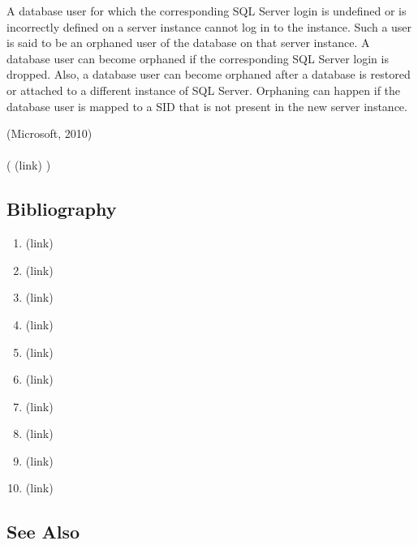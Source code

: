 \begin{DIC_BlockQuote} A database user for which the corresponding SQL Server login is undefined or is incorrectly defined on a server instance cannot log in to the instance. Such a user is said to be an orphaned user of the database on that server instance. A database user can become orphaned if the corresponding SQL Server login is dropped. Also, a database user can become orphaned after a database is restored or attached to a different instance of SQL Server. Orphaning can happen if the database user is mapped to a SID that is not present in the new server instance.  \end{DIC_BlockQuote} (Microsoft, 2010)  \paragraph{} (  (link) \href{Microsoft, 2010 }{ } )  \subsection*{Bibliography } \begin{enumerate} \item  (link) \href{Diodati and Ruddy, 2017 }{ } \item  (link) \href{Donaldson et al., 2015 }{ }   \item  (link) \href{ETSI GS ISI 002, 2013 }{ }   \item  (link) \href{Gazos and Osmanoglu, 2013 }{ }   \item  (link) \href{Haber and Rolls, 2020 }{ } \item  (link) \href{Hurakadli and Sridhar, 2012 }{ } \item  (link) \href{Kuppinger and Hill, 2020 }{ } \item  (link) \href{Mello, 2020 }{ }   \item  (link) \href{Microsoft, 2010 }{ } \item  (link) \href{Proctor et al., 2017 }{ } \end{enumerate} \subsection*{See Also } 